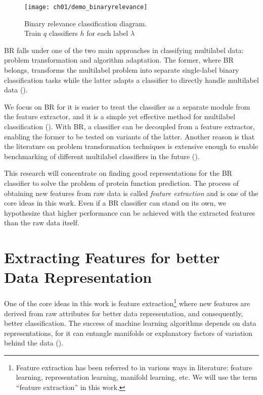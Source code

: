 \begin{figure}[!h]
  \centering
  \texttt{[image: ch01/demo\_binaryrelevance]}
  \caption[Binary relevance classification diagram]
  {Binary relevance classification diagram.\\Train $q$ classifiers $h$ for each
  label $\lambda$}
  \label{demo:binaryrelevance}
\end{figure}

\par BR falls under one of the two main approaches in classifying multilabel data:
problem transformation and algorithm adaptation. The former, where BR
belongs, transforms the multilabel problem into separate single-label binary
classification tasks while the latter adapts a classifier to directly handle
multilabel data (\cite{tsoumakas2007multilabel}).

\par We focus on BR for it is easier to treat the classifier as a separate
module from the feature extractor, and it is a simple yet effective method
for multilabel classification (\cite{luaces2012binary}). With BR, a
classifier can be decoupled from a feature extractor, enabling the former to
be tested on variants of the latter. Another reason is that the literature on
problem transformation techniques is extensive enough to enable benchmarking
of different multilabel classifiers in the future (\cite{zhang2014review,
madjarov2012extensive}).

\par This research will concentrate on finding good representations for the
BR classifier to solve the problem of protein function prediction. The
process of obtaining new features from raw data is called \textit{feature
extraction} and is one of the core ideas in this work. Even if a BR
classifier can stand on its own, we hypothesize that higher performance can
be achieved with the extracted features than the raw data itself.

\section{Extracting Features for better Data Representation}
\label{FeatureExtraction}

\par One of the core ideas in this work is feature extraction\footnote{
  Feature extraction has been referred to in various ways in literature:
  feature learning, representation learning, manifold learning, etc. We will
  use the term ``feature extraction'' in this work.
}
\textemdash where new features are derived from raw attributes for better
data representation, and consequently, better classification. The success of
machine learning algorithms depends on data representations, for it can
entangle manifolds or explanatory factors of variation behind the data
(\cite{bengio2013representation}). 

